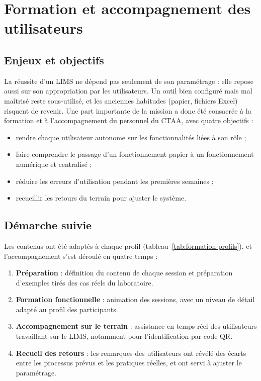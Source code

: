 \section{Formation et accompagnement des utilisateurs}

\subsection{Enjeux et objectifs}

La réussite d'un \ac{LIMS} ne dépend pas seulement de son paramétrage : elle repose aussi sur son appropriation par les utilisateurs. Un outil bien configuré mais mal maîtrisé reste sous-utilisé, et les anciennes habitudes (papier, fichiers Excel) risquent de revenir. Une part importante de la mission a donc été consacrée à la formation et à l'accompagnement du personnel du \ac{CTAA}, avec quatre objectifs :
\begin{itemize}
    \item rendre chaque utilisateur autonome sur les fonctionnalités liées à son rôle ;
    \item faire comprendre le passage d'un fonctionnement papier à un fonctionnement numérique et centralisé ;
    \item réduire les erreurs d'utilisation pendant les premières semaines ;
    \item recueillir les retours du terrain pour ajuster le système.
\end{itemize}

\subsection{Démarche suivie}

Les contenus ont été adaptés à chaque profil (tableau~\ref{tab:formation-profils}), et l'accompagnement s'est déroulé en quatre temps :
\begin{enumerate}
    \item \textbf{Préparation} : définition du contenu de chaque session et préparation d'exemples tirés des cas réels du laboratoire.
    \item \textbf{Formation fonctionnelle} : animation des sessions, avec un niveau de détail adapté au profil des participants.
    \item \textbf{Accompagnement sur le terrain} : assistance en temps réel des utilisateurs travaillant sur le \ac{LIMS}, notamment pour l'identification par code \ac{QR}.
    \item \textbf{Recueil des retours} : les remarques des utilisateurs ont révélé des écarts entre les processus prévus et les pratiques réelles, et ont servi à ajuster le paramétrage.
\end{enumerate}

